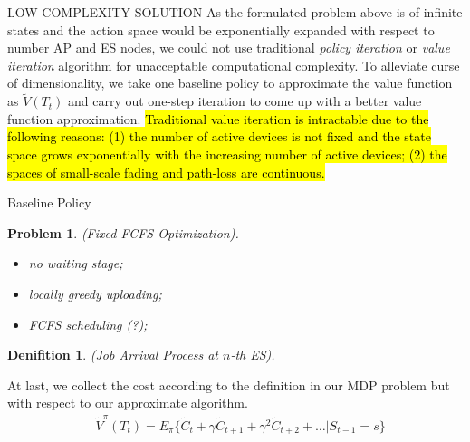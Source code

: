 \documentclass[10pt, conference, letterpaper]{IEEEtran}
\newtheorem{definition}{Denifition}
\newtheorem{problem}{Problem}
\renewcommand{\vec}{\mathbf}
\begin{document}
    \begin{section}{LOW-COMPLEXITY SOLUTION}
        \label{sec:algorithm}
        As the formulated problem above is of infinite states and the action space would be exponentially expanded with respect to number AP and ES nodes, we could not use traditional \emph{policy iteration} or \emph{value iteration} algorithm \cite{sutton1998introduction} for unacceptable computational complexity. To alleviate curse of dimensionality, we take one baseline policy to approximate the value function as $\tilde{V}(T_t)$ and carry out one-step iteration to come up with a better value function approximation.
        \hl{Traditional value iteration is intractable due to the following reasons: (1) the number of active devices is not fixed and the state space grows exponentially with the increasing number of active devices; (2) the spaces of small-scale fading and path-loss are continuous.}

        \begin{subsection}{Baseline Policy}
            \begin{problem}
                (Fixed FCFS Optimization).
                \begin{itemize}
                    \item no waiting stage;
                    \item locally greedy uploading;
                    \item FCFS scheduling (?);
                \end{itemize}
            \end{problem}

            \begin{definition}
                (Job Arrival Process at $n$-th ES).
            \end{definition}

            At last, we collect the cost according to the definition in our MDP problem but with respect to our approximate algorithm.
            \begin{align}
                & \tilde{V}^{\pi}(T_t)
                \nonumber%
                = E_{\pi} \{ \tilde{C}_{t} + \gamma \tilde{C}_{t+1} + \gamma^2 \tilde{C}_{t+2} + \dots |S_{t-1}=s \}
            \end{align}
        \end{subsection}


\end{section}
\end{document}
